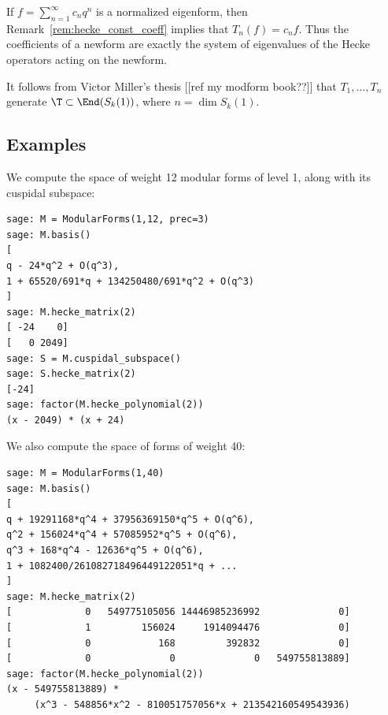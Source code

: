 \documentclass{report}
\begin{document}
If $f=\sum_{n=1}^{\infty} c_n q^n$ is a normalized eigenform, then
Remark~\ref{rem:hecke_const_coeff} implies that $T_n(f) = c_n f$.
Thus the coefficients of a newform are exactly the system of
eigenvalues of the Hecke operators acting on the newform.

\begin{remark}
  It follows from Victor Miller's thesis [[ref my modform book??]]
  that $T_1,\ldots, T_n$ generate $\T\subset \End(S_k(1))$, where
  $n=\dim S_k(1)$.
\end{remark}

\subsection{Examples}

We compute the space of weight 12 modular forms of level 1, along with its cuspidal
subspace:
\begin{lstlisting}
sage: M = ModularForms(1,12, prec=3)
sage: M.basis()
[
q - 24*q^2 + O(q^3),
1 + 65520/691*q + 134250480/691*q^2 + O(q^3)
]
sage: M.hecke_matrix(2)
[ -24    0]
[   0 2049]
sage: S = M.cuspidal_subspace()
sage: S.hecke_matrix(2)
[-24]
sage: factor(M.hecke_polynomial(2))
(x - 2049) * (x + 24)
\end{lstlisting}
\vspace{1em}

We also compute the space of forms of weight 40:
\begin{lstlisting}
sage: M = ModularForms(1,40)
sage: M.basis()
[
q + 19291168*q^4 + 37956369150*q^5 + O(q^6),
q^2 + 156024*q^4 + 57085952*q^5 + O(q^6),
q^3 + 168*q^4 - 12636*q^5 + O(q^6),
1 + 1082400/261082718496449122051*q + ...
]
sage: M.hecke_matrix(2)
[             0   549775105056 14446985236992              0]
[             1         156024     1914094476              0]
[             0            168         392832              0]
[             0              0              0   549755813889]
sage: factor(M.hecke_polynomial(2))
(x - 549755813889) *
     (x^3 - 548856*x^2 - 810051757056*x + 213542160549543936)
\end{lstlisting}
\end{document}
